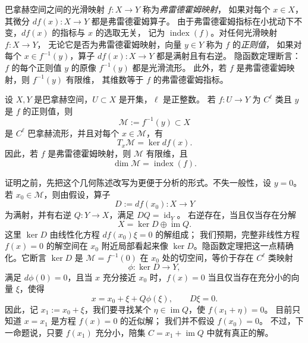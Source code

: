 巴拿赫空间之间的光滑映射 $f:X\to Y$ 称为\emph{弗雷德霍姆映射}，
如果对每个 $x\in X$，其微分 $df(x):X\to Y$ 都是弗雷德霍姆算子。
由于弗雷德霍姆指标在小扰动下不变，$df(x)$ 的指标与 $x$ 的选取无关，
记为 $\operatorname{index}(f)$。对任何光滑映射 $f:X\to Y$，
无论它是否为弗雷德霍姆映射，向量 $y\in Y$ 称为 $f$ 的\emph{正则值}，
如果对每个 $x\in f^{-1}(y)$，算子 $df(x):X\to Y$ 都是满射且有右逆。
隐函数定理断言：$f$ 的每个正则值 $y$ 的原像 $f^{-1}(y)$ 都是光滑流形。
此外，若 $f$ 是弗雷德霍姆映射，则 $f^{-1}(y)$ 有限维，
其维数等于 $f$ 的弗雷德霍姆指标。

\begin{theorem}\label{thm:A-3-3}
设 $X,Y$ 是巴拿赫空间，$U\subset X$ 是开集，$\ell$ 是正整数。
若 $f:U\to Y$ 为 $C^\ell$ 类且 $y$ 是 $f$ 的正则值，则
\[
  \mathcal M:=f^{-1}(y)\subset X
\]
是 $C^\ell$ 巴拿赫流形，并且对每个 $x\in\mathcal M$，有
\[
  T_x\mathcal M=\ker df(x).
\]
因此，若 $f$ 是弗雷德霍姆映射，则 $\mathcal M$ 有限维，且
\[
  \dim\mathcal M=\operatorname{index}(f).
\]
\end{theorem}

证明之前，先把这个几何陈述改写为更便于分析的形式。不失一般性，设 $y=0$。
若 $x_0\in\mathcal M$，则由假设，算子
\[
  D:=df(x_0):X\to Y
\]
为满射，并有右逆 $Q:Y\to X$，满足 $DQ=\operatorname{id}_Y$。
右逆存在，当且仅当存在分解
\[
  X=\ker D\oplus\operatorname{im}Q.
\]
这里 $\ker D$ 由线性化方程 $df(x_0)\xi=0$ 的解组成；
我们预期，完整非线性方程 $f(x)=0$ 的解空间在 $x_0$ 附近局部看起来像
$\ker D$。隐函数定理把这一点精确化。它断言 $\ker D$ 是
$\mathcal M=f^{-1}(0)$ 在 $x_0$ 处的切空间，等价于存在 $C^\ell$ 类映射
\[
  \phi:\ker D\to Y,
\]
满足 $d\phi(0)=0$，且当 $x$ 充分接近 $x_0$ 时，$f(x)=0$
当且仅当存在充分小的向量 $\xi$，使得
\[
  x=x_0+\xi+Q\phi(\xi),\qquad D\xi=0.
\]
因此，记 $x_1:=x_0+\xi$，我们要寻找某个
$\eta\in\operatorname{im}Q$，使 $f(x_1+\eta)=0$。
目前只知道 $x=x_1$ 是方程 $f(x)=0$ 的近似解；
我们并不假设 $f(x_0)=0$。
不过，下一命题说，只要 $f(x_1)$ 充分小，陪集
$C=x_1+\operatorname{im}Q$ 中就有真正的解。

